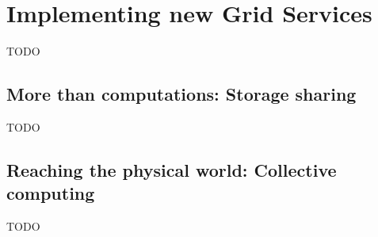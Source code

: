 \section{Implementing new Grid Services}
TODO

\subsection{More than computations: Storage sharing}
TODO

\subsection{Reaching the physical world: Collective computing}
TODO